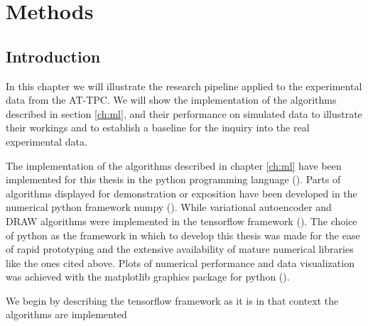 \chapter{Methods}
\section{Introduction}

In this  chapter we will illustrate the research pipeline applied to the experimental data from the AT-TPC. We will show the implementation of the algorithms described in section \ref{ch:ml}, and their performance on simulated data to illustrate their workings and to establish a baseline for the inquiry into the real experimental data.

The implementation of the algorithms described in chapter \ref{ch:ml} have been implemented for this thesis in the python programming language (\cite{python}). Parts of algorithms displayed for demonstration or exposition have been developed in the numerical python framework numpy (\cite{numpy}). While variational autoencoder and DRAW algorithms were implemented in the tensorflow framework (\cite{tensorflow}). The choice of python as the framework in which to develop this thesis was made for the ease of rapid prototyping and the extensive availability of mature numerical libraries like the ones cited above. Plots of numerical performance and data visualization was achieved with the matplotlib graphics package for python (\cite{matplotlib}).

We begin by describing the tensorflow framework as it is in that context the algorithms are implemented 
